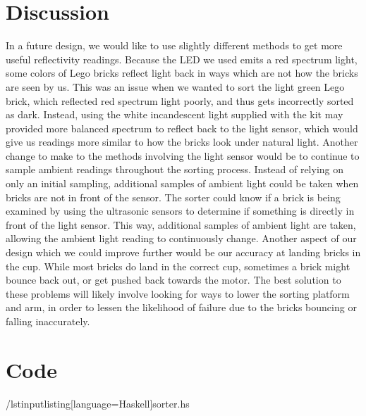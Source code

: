 \documentclass{article}
\begin{document}
\section{Discussion}
In a future design, we would like to use slightly different methods to get more useful reflectivity readings. 
Because the LED we used emits a red spectrum light, some colors of Lego bricks reflect light back in ways which are not how the bricks are seen by us. 
This was an issue when we wanted to sort the light green Lego brick, which reflected red spectrum light poorly, and thus gets incorrectly sorted as dark.
Instead, using the white incandescent light supplied with the kit may provided more balanced spectrum to reflect back to the light sensor, which would give us readings more similar to how the bricks look under natural light. 
Another change to make to the methods involving the light sensor would be to continue to sample ambient readings throughout the sorting process. 
Instead of relying on only an initial sampling, additional samples of ambient light could be taken when bricks are not in front of the sensor. 
The sorter could know if a brick is being examined by using the ultrasonic sensors to determine if something is directly in front of the light sensor. 
This way, additional samples of ambient light are taken, allowing the ambient light reading to continuously change.
Another aspect of our design which we could improve further would be our accuracy at landing bricks in the cup. 
While most bricks do land in the correct cup, sometimes a brick might bounce back out, or get pushed back towards the motor. 
The best solution to these problems will likely involve looking for ways to lower the sorting platform and arm, in order to lessen the likelihood of failure due to the bricks bouncing or falling inaccurately.  

\newpage
\appendix
\section{Code}

/lstinputlisting[language=Haskell]{sorter.hs}
\end{document}
